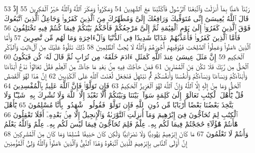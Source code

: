 {\tiny\colorbox{cl_aya}{53}} رَبَّنَآ ءَامَنَّا بِمَآ أَنزَلْتَ وَٱتَّبَعْنَا ٱلرَّسُولَ فَٱكْتُبْنَا مَعَ ٱلشَّٰهِدِينَ
{\tiny\colorbox{cl_aya}{54}} وَمَكَرُوا۟ وَمَكَرَ ٱللَّهُ وَٱللَّهُ خَيْرُ ٱلْمَٰكِرِينَ
{\tiny\colorbox{cl_aya}{55}} إِذْ قَالَ ٱللَّهُ يَٰعِيسَىٰٓ إِنِّى مُتَوَفِّيكَ وَرَافِعُكَ إِلَىَّ وَمُطَهِّرُكَ مِنَ ٱلَّذِينَ كَفَرُوا۟ وَجَاعِلُ ٱلَّذِينَ ٱتَّبَعُوكَ فَوْقَ ٱلَّذِينَ كَفَرُوٓا۟ إِلَىٰ يَوْمِ ٱلْقِيَٰمَةِ ثُمَّ إِلَىَّ مَرْجِعُكُمْ فَأَحْكُمُ بَيْنَكُمْ فِيمَا كُنتُمْ فِيهِ تَخْتَلِفُونَ
{\tiny\colorbox{cl_aya}{56}} فَأَمَّا ٱلَّذِينَ كَفَرُوا۟ فَأُعَذِّبُهُمْ عَذَابًا شَدِيدًا فِى ٱلدُّنْيَا وَٱلْءَاخِرَةِ وَمَا لَهُم مِّن نَّٰصِرِينَ
{\tiny\colorbox{cl_aya}{57}} وَأَمَّا ٱلَّذِينَ ءَامَنُوا۟ وَعَمِلُوا۟ ٱلصَّٰلِحَٰتِ فَيُوَفِّيهِمْ أُجُورَهُمْ وَٱللَّهُ لَا يُحِبُّ ٱلظَّٰلِمِينَ
{\tiny\colorbox{cl_aya}{58}} ذَٰلِكَ نَتْلُوهُ عَلَيْكَ مِنَ ٱلْءَايَٰتِ وَٱلذِّكْرِ ٱلْحَكِيمِ
{\tiny\colorbox{cl_aya}{59}} إِنَّ مَثَلَ عِيسَىٰ عِندَ ٱللَّهِ كَمَثَلِ ءَادَمَ خَلَقَهُۥ مِن تُرَابٍ ثُمَّ قَالَ لَهُۥ كُن فَيَكُونُ
{\tiny\colorbox{cl_aya}{60}} ٱلْحَقُّ مِن رَّبِّكَ فَلَا تَكُن مِّنَ ٱلْمُمْتَرِينَ
{\tiny\colorbox{cl_aya}{61}} فَمَنْ حَآجَّكَ فِيهِ مِنۢ بَعْدِ مَا جَآءَكَ مِنَ ٱلْعِلْمِ فَقُلْ تَعَالَوْا۟ نَدْعُ أَبْنَآءَنَا وَأَبْنَآءَكُمْ وَنِسَآءَنَا وَنِسَآءَكُمْ وَأَنفُسَنَا وَأَنفُسَكُمْ ثُمَّ نَبْتَهِلْ فَنَجْعَل لَّعْنَتَ ٱللَّهِ عَلَى ٱلْكَٰذِبِينَ
{\tiny\colorbox{cl_aya}{62}} إِنَّ هَٰذَا لَهُوَ ٱلْقَصَصُ ٱلْحَقُّ وَمَا مِنْ إِلَٰهٍ إِلَّا ٱللَّهُ وَإِنَّ ٱللَّهَ لَهُوَ ٱلْعَزِيزُ ٱلْحَكِيمُ
{\tiny\colorbox{cl_aya}{63}} فَإِن تَوَلَّوْا۟ فَإِنَّ ٱللَّهَ عَلِيمٌۢ بِٱلْمُفْسِدِينَ
{\tiny\colorbox{cl_aya}{64}} قُلْ يَٰٓأَهْلَ ٱلْكِتَٰبِ تَعَالَوْا۟ إِلَىٰ كَلِمَةٍ سَوَآءٍۭ بَيْنَنَا وَبَيْنَكُمْ أَلَّا نَعْبُدَ إِلَّا ٱللَّهَ وَلَا نُشْرِكَ بِهِۦ شَيْـًٔا وَلَا يَتَّخِذَ بَعْضُنَا بَعْضًا أَرْبَابًا مِّن دُونِ ٱللَّهِ فَإِن تَوَلَّوْا۟ فَقُولُوا۟ ٱشْهَدُوا۟ بِأَنَّا مُسْلِمُونَ
{\tiny\colorbox{cl_aya}{65}} يَٰٓأَهْلَ ٱلْكِتَٰبِ لِمَ تُحَآجُّونَ فِىٓ إِبْرَٰهِيمَ وَمَآ أُنزِلَتِ ٱلتَّوْرَىٰةُ وَٱلْإِنجِيلُ إِلَّا مِنۢ بَعْدِهِۦٓ أَفَلَا تَعْقِلُونَ
{\tiny\colorbox{cl_aya}{66}} هَٰٓأَنتُمْ هَٰٓؤُلَآءِ حَٰجَجْتُمْ فِيمَا لَكُم بِهِۦ عِلْمٌ فَلِمَ تُحَآجُّونَ فِيمَا لَيْسَ لَكُم بِهِۦ عِلْمٌ وَٱللَّهُ يَعْلَمُ وَأَنتُمْ لَا تَعْلَمُونَ
{\tiny\colorbox{cl_aya}{67}} مَا كَانَ إِبْرَٰهِيمُ يَهُودِيًّا وَلَا نَصْرَانِيًّا وَلَٰكِن كَانَ حَنِيفًا مُّسْلِمًا وَمَا كَانَ مِنَ ٱلْمُشْرِكِينَ
{\tiny\colorbox{cl_aya}{68}} إِنَّ أَوْلَى ٱلنَّاسِ بِإِبْرَٰهِيمَ لَلَّذِينَ ٱتَّبَعُوهُ وَهَٰذَا ٱلنَّبِىُّ وَٱلَّذِينَ ءَامَنُوا۟ وَٱللَّهُ وَلِىُّ ٱلْمُؤْمِنِينَ
